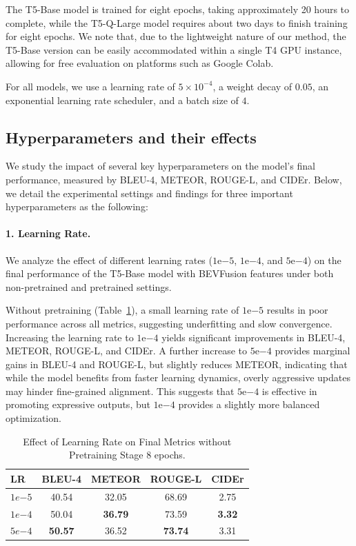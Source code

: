 \documentclass{article} %
\begin{document}
The T5-Base model is trained for eight epochs, taking approximately 20 hours to complete, while the T5-Q-Large model requires about two days to finish training for eight epochs. We note that, due to the lightweight nature of our method, the T5-Base version can be easily accommodated within a single T4 GPU instance, allowing for free evaluation on platforms such as Google Colab.

For all models, we use a learning rate of $5\times10^{-4}$, a weight decay of $0.05$, an exponential learning rate scheduler, and a batch size of $4$.





\subsection{Hyperparameters and their effects}


We study the impact of several key hyperparameters on the model’s final performance, measured by BLEU-4, METEOR, ROUGE-L, and CIDEr. Below, we detail the experimental settings and findings for three important hyperparameters as the following:

\paragraph{1. Learning Rate.}
We analyze the effect of different learning rates ($1\text{e}{-5}$, $1\text{e}{-4}$, and $5\text{e}{-4}$) on the final performance of the T5-Base model with BEVFusion features under both non-pretrained and pretrained settings.

Without pretraining (Table~\ref{tab:lr_effectwopretrain}), a small learning rate of $1\text{e}{-5}$ results in poor performance across all metrics, suggesting underfitting and slow convergence. Increasing the learning rate to $1\text{e}{-4}$ yields significant improvements in BLEU-4, METEOR, ROUGE-L, and CIDEr. A further increase to $5\text{e}{-4}$ provides marginal gains in BLEU-4 and ROUGE-L, but slightly reduces METEOR, indicating that while the model benefits from faster learning dynamics, overly aggressive updates may hinder fine-grained alignment. This suggests that $5\text{e}{-4}$ is effective in promoting expressive outputs, but $1\text{e}{-4}$ provides a slightly more balanced optimization.
\begin{table}[H]
    \centering
    \small
    \begin{tabular}{lcccc}
        \toprule
        \textbf{LR} & \textbf{BLEU-4} & \textbf{METEOR} & \textbf{ROUGE-L} & \textbf{CIDEr} \\
        \midrule
        $1e{-5}$   & 40.54 & 32.05 & 68.69 & 2.75 \\
        $1e{-4}$   & 50.04 & \textbf{36.79} & 73.59 & \textbf{3.32} \\
        $5e{-4}$   & \textbf{50.57} & 36.52 & \textbf{73.74} & 3.31 \\
        \bottomrule
    \end{tabular}
    \caption{Effect of Learning Rate on Final Metrics without Pretraining Stage 8 epochs.}
    \label{tab:lr_effectwopretrain}
\end{table}
\end{document}
